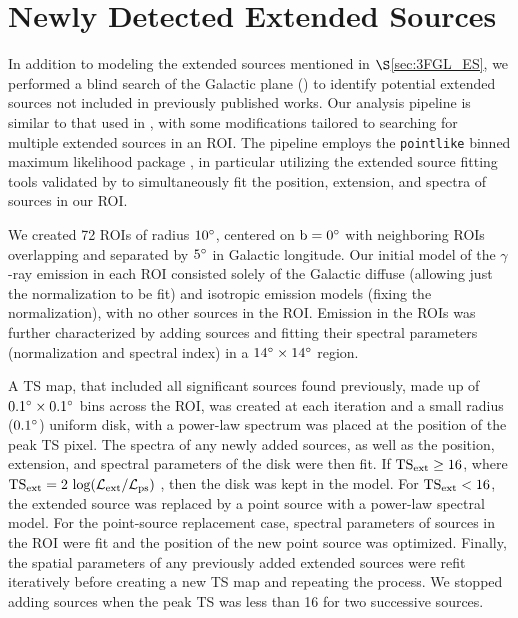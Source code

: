 %
%
\section{\label{sec:newES}Newly Detected Extended Sources} %

In addition to modeling the extended sources mentioned in $\S$\ref{sec:3FGL_ES}, we performed a blind search of the Galactic plane  (\blat) to identify potential extended sources not included in previously published works. Our analysis pipeline is similar to that used in \cite{hewittSNRcat13}, with some modifications tailored to searching for multiple extended sources in an ROI. The pipeline employs the {\tt pointlike} binned maximum likelihood package \citep{Kerr10}, in particular utilizing the extended source fitting tools validated by \cite{Lande12} to simultaneously fit the position, extension, and spectra of sources in our ROI. 

We created 72 ROIs of radius ${\rm 10^{\circ}}$, centered on ${\rm b = 0^{\circ}}$ with neighboring ROIs overlapping and separated by ${\rm 5^{\circ}}$ in Galactic longitude.  Our initial model of the $\gamma$-ray emission in each ROI consisted solely of the Galactic diffuse (allowing just the normalization to be fit) and isotropic emission models (fixing the normalization), with no other sources in the ROI. Emission in the ROIs was further characterized by adding sources and fitting their spectral parameters (normalization and spectral index) in a ${\rm 14^{\circ}}\times{\rm 14^{\circ}}$ region. %

A TS map, that included all significant sources found previously, made up of ${\rm 0.1^{\circ}}\times{\rm 0.1^{\circ}}$ bins across the ROI, was created at each iteration and a small radius (${\rm 0.1^{\circ}}$) uniform disk, with a power-law spectrum was placed at the position of the peak TS pixel. The spectra of any newly added sources, as well as the position, extension, and spectral parameters of the disk were then fit. If $\rm TS_{ext} \geq 16$, where  ${\rm TS_{ext} = 2~log(\mathcal{L}_{ext} / \mathcal{L}_{ps})}$ \citep[\ie twice the logarithm likelihood ratio of an extended to a point source,][]{Lande12}, then the disk was kept in the model. For $\rm TS_{ext} < 16$, the extended source was replaced by a point source with a power-law spectral model. For the point-source replacement case, spectral parameters of sources in the ROI were fit and the position of the new point source was optimized. Finally, the spatial parameters of any previously added extended sources were refit iteratively before creating a new TS map and repeating the process. We stopped adding sources when the peak TS was less than 16 for two successive sources. 

